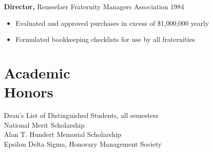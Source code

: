 \documentclass{res}
\begin{document}
\begin{resume}
                  {\bf  Director,}  Rensselaer Fraternity Managers
              Association     \hfill                                 1984
                 \begin{itemize} \itemsep -2pt

               \item    Evaluated and approved purchases in excess of
                 {\$}1,000,000 yearly

               \item  Formulated bookkeeping checklists for use by all
                 fraternities
		 \end{itemize}

\section{Academic \\ Honors}
Dean's List of Distinguished Students, all semesters \\
National Merit Scholarship \\
Alan T. Hundert Memorial Scholarship \\
 Epsilon Delta Sigma, Honorary Management Society


\vspace{0.2in}

\end{resume}
\end{document}
